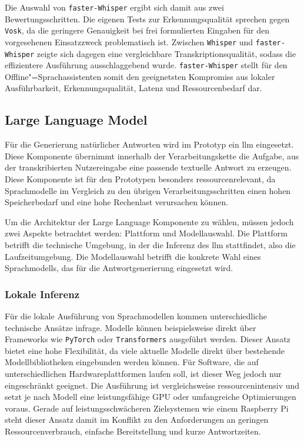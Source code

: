 Die Auswahl von \texttt{faster-Whisper} ergibt sich damit aus zwei Bewertungsschritten. Die eigenen Tests zur Erkennungsqualität sprechen gegen \texttt{Vosk}, da die geringere Genauigkeit bei frei formulierten Eingaben für den vorgesehenen Einsatzzweck problematisch ist. Zwischen \texttt{Whisper} und \texttt{faster-Whisper} zeigte sich dagegen eine vergleichbare Transkriptionsqualität, sodass die effizientere Ausführung ausschlaggebend wurde. \texttt{faster-Whisper} stellt für den Offline"=Sprachassistenten somit den geeignetsten Kompromiss aus lokaler Ausführbarkeit, Erkennungsqualität, Latenz und Ressourcenbedarf dar.


\subsection{Large Language Model}
\label{subsec:Large_Language_Model}
Für die Generierung natürlicher Antworten wird im Prototyp ein \gls{llm} eingesetzt. Diese Komponente übernimmt innerhalb der Verarbeitungskette die Aufgabe, aus der transkribierten Nutzereingabe eine passende textuelle Antwort zu erzeugen. Diese Komponente ist für den Prototypen besonders ressourcenrelevant, da Sprachmodelle im Vergleich zu den übrigen Verarbeitungsschritten einen hohen Speicherbedarf und eine hohe Rechenlast verursachen können.

Um die Architektur der Large Language Komponente zu wählen, müssen jedoch zwei Aspekte betrachtet werden: Plattform und Modellauswahl. Die Plattform betrifft die technische Umgebung, in der die Inferenz des \gls{llm} stattfindet, also die Laufzeitumgebung. Die Modellauswahl betrifft die konkrete Wahl eines Sprachmodells, das für die Antwortgenerierung eingesetzt wird.


\subsubsection{Lokale Inferenz}
\label{subsec:Lokale_Inferenz}
Für die lokale Ausführung von Sprachmodellen kommen unterschiedliche technische Ansätze infrage. Modelle können beispielsweise direkt über Frameworks wie \texttt{PyTorch} \autocite{PyTorch-Documentation} oder \texttt{Transformers} \autocite{Transformers-Documentation} ausgeführt werden. Dieser Ansatz bietet eine hohe Flexibilität, da viele aktuelle Modelle direkt über bestehende Modellbibliotheken eingebunden werden können. Für Software, die auf unterschiedlichen Hardwareplattformen laufen soll, ist dieser Weg jedoch nur eingeschränkt geeignet. Die Ausführung ist vergleichsweise ressourcenintensiv und setzt je nach Modell eine leistungsfähige GPU oder umfangreiche Optimierungen voraus. Gerade auf leistungsschwächeren Zielsystemen wie einem Raspberry Pi steht dieser Ansatz damit im Konflikt zu den Anforderungen an geringen Ressourcenverbrauch, einfache Bereitstellung und kurze Antwortzeiten.

